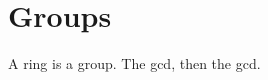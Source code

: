 \documentclass{article}
\begin{document}
\section{Groups}
A \gls{ring} is a \gls{group}. The \gls{gcd}, then the \gls{gcd}.
\printnoidxglossaries
\end{document}
